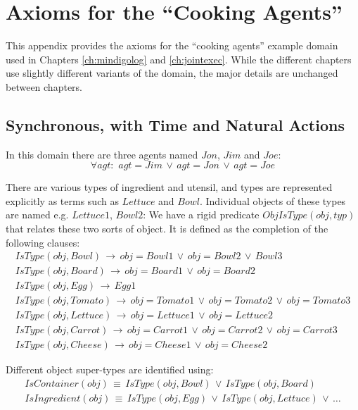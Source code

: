 

\chapter{Axioms for the {}``Cooking Agents''}

\label{ch:cookingagents}

This appendix provides the axioms for the {}``cooking agents'' example
domain used in Chapters \ref{ch:mindigolog} and \ref{ch:jointexec}.
While the different chapters use slightly different variants of the
domain, the major details are unchanged between chapters.


\section*{Synchronous, with Time and Natural Actions}

In this domain there are three agents named $Jon$, $Jim$ and $Joe$:\[
\forall agt:\,\, agt=Jim\,\vee\, agt=Jon\,\vee\, agt=Joe\]


There are various types of ingredient and utensil, and types are represented
explicitly as terms such as $Lettuce$ and $Bowl.$ Individual objects
of these types are named e.g. $Lettuce1$, $Bowl2$: We have a rigid
predicate $ObjIsType(obj,typ)$ that relates these two sorts of object.
It is defined as the completion of the following clauses:\begin{gather*}
IsType(obj,Bowl)\,\rightarrow\, obj=Bowl1\,\vee\, obj=Bowl2\,\vee\, Bowl3\\
IsType(obj,Board)\,\rightarrow\, obj=Board1\,\vee\, obj=Board2\\
IsType(obj,Egg)\,\rightarrow\, Egg1\\
IsType(obj,Tomato)\,\rightarrow\, obj=Tomato1\,\vee\, obj=Tomato2\,\vee\, obj=Tomato3\\
IsType(obj,Lettuce)\,\rightarrow\, obj=Lettuce1\,\vee\, obj=Lettuce2\\
IsType(obj,Carrot)\,\rightarrow\, obj=Carrot1\,\vee\, obj=Carrot2\,\vee\, obj=Carrot3\\
IsType(obj,Cheese)\,\rightarrow\, obj=Cheese1\,\vee\, obj=Cheese2\end{gather*}


Different object super-types are identified using:\begin{gather*}
IsContainer(obj)\,\equiv\, IsType(obj,Bowl)\,\vee\, IsType(obj,Board)\\
IsIngredient(obj)\,\equiv\, IsType(obj,Egg)\,\vee\, IsType(obj,Lettuce)\,\vee\,\dots\end{gather*}


